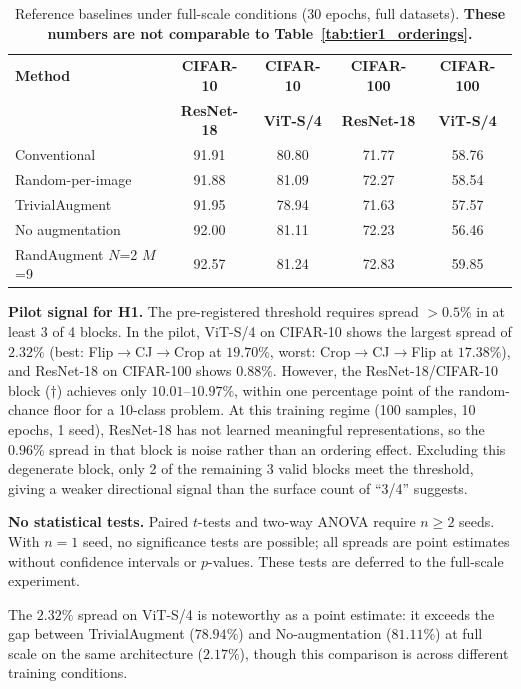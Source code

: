 \documentclass{article}
\begin{document}
\begin{table}[t]
\centering
\caption{Reference baselines under full-scale conditions (30 epochs, full datasets). \textbf{These numbers are not comparable to Table~\ref{tab:tier1_orderings}.}}
\label{tab:tier1_baselines}
\small
\begin{tabular}{lcccc}
\toprule
\textbf{Method} & \textbf{CIFAR-10} & \textbf{CIFAR-10} & \textbf{CIFAR-100} & \textbf{CIFAR-100} \\
 & \textbf{ResNet-18} & \textbf{ViT-S/4} & \textbf{ResNet-18} & \textbf{ViT-S/4} \\
\midrule
Conventional & 91.91 & 80.80 & 71.77 & 58.76 \\
Random-per-image & 91.88 & 81.09 & 72.27 & 58.54 \\
TrivialAugment & 91.95 & 78.94 & 71.63 & 57.57 \\
No augmentation & 92.00 & 81.11 & 72.23 & 56.46 \\
RandAugment $N$=2 $M$=9 & 92.57 & 81.24 & 72.83 & 59.85 \\
\bottomrule
\end{tabular}
\end{table}

\textbf{Pilot signal for H1.} The pre-registered threshold requires spread $> 0.5\%$ in at least 3 of 4 blocks. In the pilot, ViT-S/4 on CIFAR-10 shows the largest spread of $2.32\%$ (best: Flip$\to$CJ$\to$Crop at $19.70\%$, worst: Crop$\to$CJ$\to$Flip at $17.38\%$), and ResNet-18 on CIFAR-100 shows $0.88\%$. However, the ResNet-18/CIFAR-10 block ($\dagger$) achieves only $10.01$--$10.97\%$, within one percentage point of the random-chance floor for a 10-class problem. At this training regime (100 samples, 10 epochs, 1 seed), ResNet-18 has not learned meaningful representations, so the $0.96\%$ spread in that block is noise rather than an ordering effect. Excluding this degenerate block, only 2 of the remaining 3 valid blocks meet the threshold, giving a weaker directional signal than the surface count of ``3/4'' suggests.

\textbf{No statistical tests.} Paired $t$-tests and two-way ANOVA require $n \geq 2$ seeds. With $n=1$ seed, no significance tests are possible; all spreads are point estimates without confidence intervals or $p$-values. These tests are deferred to the full-scale experiment.

The $2.32\%$ spread on ViT-S/4 is noteworthy as a point estimate: it exceeds the gap between TrivialAugment ($78.94\%$) and No-augmentation ($81.11\%$) at full scale on the same architecture ($2.17\%$), though this comparison is across different training conditions.
\end{document}
